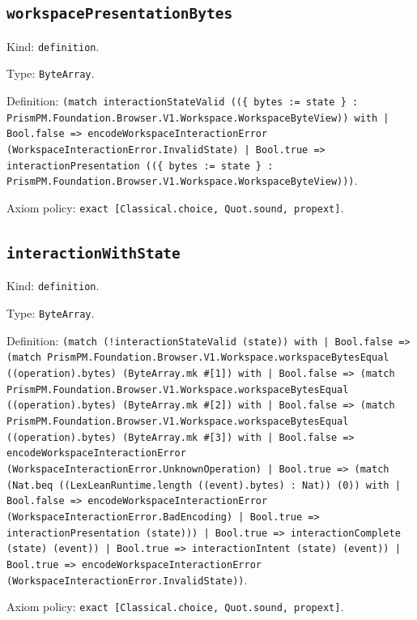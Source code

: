 \documentclass[11pt]{article}
\begin{document}
\subsection*{\texttt{workspacePresentationBytes}}
\noindent Kind: \texttt{definition}.\par
\noindent Type: \texttt{ByteArray}.\par
\noindent Definition: \texttt{(match interactionStateValid ((\{ bytes := state \} : PrismPM.Foundation.Browser.V1.Workspace.WorkspaceByteView)) with | Bool.false => encodeWorkspaceInteractionError (WorkspaceInteractionError.InvalidState) | Bool.true => interactionPresentation ((\{ bytes := state \} : PrismPM.Foundation.Browser.V1.Workspace.WorkspaceByteView)))}.\par
\noindent Axiom policy: \texttt{exact [Classical.choice, Quot.sound, propext]}.\par
\subsection*{\texttt{interactionWithState}}
\noindent Kind: \texttt{definition}.\par
\noindent Type: \texttt{ByteArray}.\par
\noindent Definition: \texttt{(match (!interactionStateValid (state)) with | Bool.false => (match PrismPM.Foundation.Browser.V1.Workspace.workspaceBytesEqual ((operation).bytes) (ByteArray.mk \#[1]) with | Bool.false => (match PrismPM.Foundation.Browser.V1.Workspace.workspaceBytesEqual ((operation).bytes) (ByteArray.mk \#[2]) with | Bool.false => (match PrismPM.Foundation.Browser.V1.Workspace.workspaceBytesEqual ((operation).bytes) (ByteArray.mk \#[3]) with | Bool.false => encodeWorkspaceInteractionError (WorkspaceInteractionError.UnknownOperation) | Bool.true => (match (Nat.beq ((LexLeanRuntime.length ((event).bytes) : Nat)) (0)) with | Bool.false => encodeWorkspaceInteractionError (WorkspaceInteractionError.BadEncoding) | Bool.true => interactionPresentation (state))) | Bool.true => interactionComplete (state) (event)) | Bool.true => interactionIntent (state) (event)) | Bool.true => encodeWorkspaceInteractionError (WorkspaceInteractionError.InvalidState))}.\par
\noindent Axiom policy: \texttt{exact [Classical.choice, Quot.sound, propext]}.\par
\end{document}
